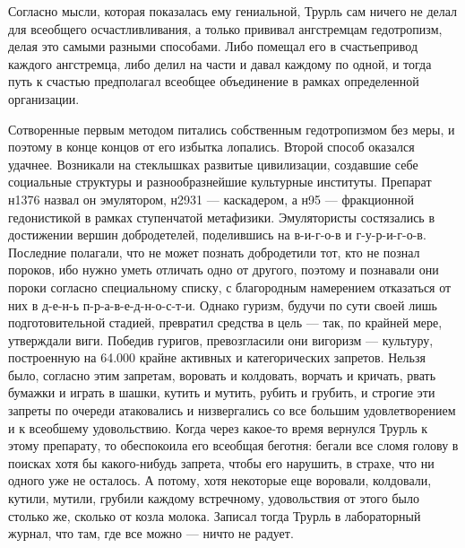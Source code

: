 Согласно мысли, которая показалась ему гениальной, Трурль
сам ничего не делал для всеобщего осчастливливания, а только
прививал ангстремцам гедотропизм, делая это самыми разными
способами. Либо помещал его в счастьепривод каждого
ангстремца, либо делил на части и давал каждому по одной, и
тогда путь к счастью предполагал всеобщее объединение в
рамках определенной организации.

Сотворенные первым методом питались собственным
гедотропизмом без меры, и поэтому в конце концов от его
избытка лопались. Второй способ оказался удачнее. Возникали
на стеклышках развитые цивилизации, создавшие себе
социальные структуры и разнообразнейшие культурные
институты. Препарат н1376 назвал он эмулятором, н2931 --- каскадером,
а н95 --- фракционной гедонистикой в рамках
ступенчатой метафизики. Эмулятористы состязались в
достижении вершин добродетелей, поделившись на в-и-г-о-в и
г-у-р-и-г-о-в. Последние полагали, что не может познать
добродетили тот, кто не познал пороков, ибо нужно уметь
отличать одно от другого, поэтому и познавали они пороки
согласно специальному списку, с благородным намерением
отказаться от них в д-е-н-ь п-р-а-в-е-д-н-о-с-т-и. Однако
гуризм, будучи по сути своей лишь подготовительной стадией,
превратил средства в цель --- так, по крайней мере, утверждали
виги. Победив гуригов, превозгласили они вигоризм --- культуру,
построенную на 64.000 крайне активных и
категорических запретов. Нельзя было, согласно этим
запретам, воровать и колдовать, ворчать и кричать, рвать
бумажки и играть в шашки, кутить и мутить, рубить и грубить,
и строгие эти запреты по очереди атаковались и низвергались
со все большим удовлетворением и к всеобшему удовольствию.
Когда через какое-то время вернулся Трурль к этому
препарату, то обеспокоила его всеобщая беготня: бегали все
сломя голову в поисках хотя бы какого-нибудь запрета, чтобы
его нарушить, в страхе, что ни одного уже не осталось. А
потому, хотя некоторые еще воровали, колдовали, кутили,
мутили, грубили каждому встречному, удовольствия от этого
было столько же, сколько от козла молока. Записал тогда
Трурль в лабораторный журнал, что там, где все можно --- ничто
не радует.

